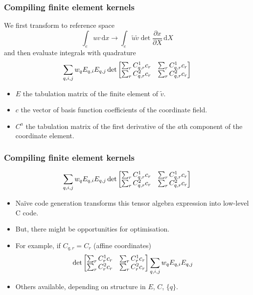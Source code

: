 \documentclass[presentation]{beamer}
\begin{document}
\begin{frame}[fragile]
  \frametitle{Compiling finite element kernels}
  We first transform to reference space
  \begin{equation*}
    \int_e u v\, \text{d}x \rightarrow \int_e \tilde{u} \tilde{v} \det{\frac{\partial x}{\partial
        X}}\,\text{d} X
  \end{equation*}
  and then evaluate integrals with quadrature
  \begin{equation*}
    \sum_{q,i,j} w_q E_{q,i} E_{q,j} \det{%
      \begin{bmatrix}
        \sum_r C_{q,r}^{1}c_r & \sum_r C_{q,r}^{1}c_r \\
        \sum_r C_{q,r}^{2}c_r & \sum_r C_{q,r}^{2}c_r
      \end{bmatrix}
    }
  \end{equation*}
  \begin{itemize}
  \item $E$ the tabulation matrix of the finite element of $\tilde{v}$.
  \item $c$ the vector of basis function coefficients of the
    coordinate field.
  \item $C^a$ the tabulation matrix of the first derivative of the
    $a$th component of the coordinate element.
  \end{itemize}
\end{frame}
\begin{frame}
  \frametitle{Compiling finite element kernels}
  \begin{equation*}
    \sum_{q, i, j} w_q E_{q,i} E_{q,j} \det{%
      \begin{bmatrix}
        \sum_r C_{q,r}^{1}c_r & \sum_r C_{q,r}^{1}c_r \\
        \sum_r C_{q,r}^{2}c_r & \sum_r C_{q,r}^{2}c_r
      \end{bmatrix}
    }
  \end{equation*}

  \begin{itemize}
  \item Na\"ive code generation transforms this tensor algebra
    expression into low-level C code.
  \item But, there might be opportunities for optimisation.
  \item For example, if $C_{q,r} = C_r$ (affine coordinates)
  \begin{equation*}
    \det{%
      \begin{bmatrix}
        \sum_r C_{r}^{1}c_r & \sum_r C_{r}^{1}c_r \\
        \sum_r C_{r}^{2}c_r & \sum_r C_{r}^{2}c_r
      \end{bmatrix}
    }\sum_{q, i, j} w_q E_{q,i} E_{q,j}
  \end{equation*}
\item Others available, depending on structure in $E$, $C$, $\{q\}$.
  \end{itemize}
\end{frame}
\end{document}
